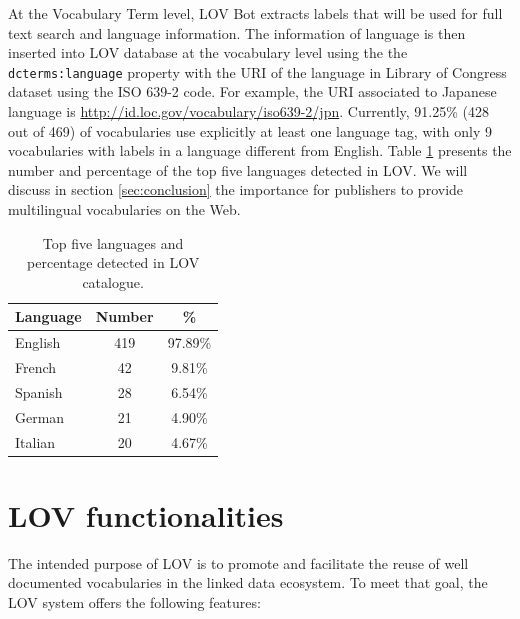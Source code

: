 \documentclass{iosart2c}
\begin{document}
At the Vocabulary Term level, LOV Bot extracts labels that will be used for full text search and language information. The information of language is then inserted into LOV database at the vocabulary level using the the \texttt{dcterms:language} property with the URI of the language in Library of Congress dataset using the ISO 639-2 code. For example, the URI associated to Japanese language is \url{http://id.loc.gov/vocabulary/iso639-2/jpn}. Currently, 91.25\% (428 out of 469) of vocabularies use explicitly at least one language tag, with only 9 vocabularies with labels in a language different from English. Table \ref{tab:language} presents the number and percentage of the top five languages detected in LOV. We will discuss in section \ref{sec:conclusion} the importance for publishers to provide multilingual vocabularies on the Web.
 
 \begin{table}[h!tb]
\caption{Top five languages and percentage detected in LOV catalogue.}
\begin{tabular}{lcc}
\hline
\textbf{Language} & \textbf{Number} & \textbf{\%}  \\ \hline
English  & 419   &  97.89\%      \\
French & 42 & 9.81\% \\
Spanish & 28 & 6.54\%\\
German & 21 & 4.90\%\\
Italian & 20 & 4.67\%\\
\hline  
\end{tabular}
\label{tab:language}
\end{table}

\section{LOV functionalities}
\label{sec:about}

The intended purpose of LOV is to promote and facilitate the reuse of well documented vocabularies in the linked data ecosystem. To meet that goal, the LOV system offers the following features:
\end{document}
